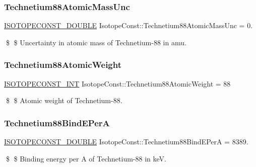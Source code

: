 \subsubsection{\texorpdfstring{Technetium88\+Atomic\+Mass\+Unc}{Technetium88AtomicMassUnc}}
{\footnotesize\ttfamily \mbox{\hyperlink{group___isotope_const-_macros_ga8f45a7272ce02c0b4c65c44636ed719a}{I\+S\+O\+T\+O\+P\+E\+C\+O\+N\+S\+T\+\_\+\+D\+O\+U\+B\+LE}} Isotope\+Const\+::\+Technetium88\+Atomic\+Mass\+Unc = 0.}

\$ \$ Uncertainty in atomic mass of Technetium-\/88 in amu. \mbox{\label{group___isotope_const-_technetium-_tc88_gaa501fe39acf3d2b5478677bab70f4260}} 
\subsubsection{\texorpdfstring{Technetium88\+Atomic\+Weight}{Technetium88AtomicWeight}}
{\footnotesize\ttfamily \mbox{\hyperlink{group___isotope_const-_macros_ga5f18360b3e99483a35c32d789e62621c}{I\+S\+O\+T\+O\+P\+E\+C\+O\+N\+S\+T\+\_\+\+I\+NT}} Isotope\+Const\+::\+Technetium88\+Atomic\+Weight = 88}

\$ \$ Atomic weight of Technetium-\/88. \mbox{\label{group___isotope_const-_technetium-_tc88_ga75c633887fc3bc702845645bc197b4ed}} 
\subsubsection{\texorpdfstring{Technetium88\+Bind\+E\+PerA}{Technetium88BindEPerA}}
{\footnotesize\ttfamily \mbox{\hyperlink{group___isotope_const-_macros_ga8f45a7272ce02c0b4c65c44636ed719a}{I\+S\+O\+T\+O\+P\+E\+C\+O\+N\+S\+T\+\_\+\+D\+O\+U\+B\+LE}} Isotope\+Const\+::\+Technetium88\+Bind\+E\+PerA = 8389.}

\$ \$ Binding energy per A of Technetium-\/88 in keV. \mbox{\label{group___isotope_const-_technetium-_tc88_ga483441ff42a6a1067bbad39e47290348}} 
